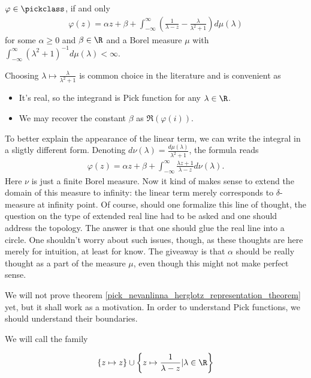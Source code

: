 \begin{lause}\label{pick_nevanlinna_herglotz_representation_theorem}
	$\varphi \in \pickclass$, if and only
	\begin{align}\label{pick_representation}
		\varphi(z) = \alpha z + \beta + \int_{-\infty}^{\infty} \left(\frac{1}{\lambda - z} - \frac{\lambda}{\lambda^2 + 1}\right) d \mu(\lambda)
	\end{align}
	for some $\alpha \geq 0$ and $\beta \in \R$ and a Borel measure $\mu$ with $\int_{-\infty}^{\infty} (\lambda^2 + 1)^{-1} d \mu(\lambda) < \infty$.
\end{lause}

Choosing $\lambda \mapsto \frac{\lambda}{\lambda^2 + 1}$ is common choice in the literature and is convenient as
\begin{itemize}
	\item It's real, so the integrand is Pick function for any $\lambda \in \R$.
	\item We may recover the constant $\beta$ as $\Re(\varphi(i))$.
\end{itemize}

To better explain the appearance of the linear term, we can write the integral in a sligtly different form. Denoting $d \nu(\lambda) = \frac{d \mu(\lambda)}{\lambda^2 + 1}$, the formula reads
\begin{align*}
	\varphi(z) = \alpha z + \beta + \int_{-\infty}^{\infty} \frac{\lambda z + 1}{\lambda - z} d \nu(\lambda).
\end{align*}
Here $\nu$ is just a finite Borel measure. Now it kind of makes sense to extend the domain of this measure to infinity: the linear term merely corresponds to $\delta$-measure at infinity point. Of course, should one formalize this line of thought, the question on the type of extended real line had to be asked and one should address the topology. The answer is that one should glue the real line into a circle. One shouldn't worry about such issues, though, as these thoughts are here merely for intuition, at least for know. The giveaway is that $\alpha$ should be really thought as a part of the measure $\mu$, even though this might not make perfect sense.

We will not prove theorem \ref{pick_nevanlinna_herglotz_representation_theorem} yet, but it shall work as a motivation. In order to understand Pick functions, we should understand their boundaries.

We will call the family

\begin{align*}
	\{z \mapsto z\} \cup \left\{z \mapsto \frac{1}{\lambda - z} | \lambda \in \R\right\}
\end{align*}

